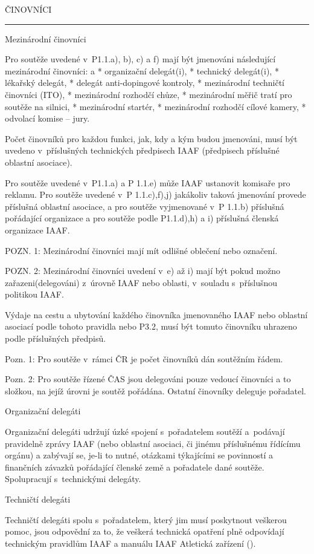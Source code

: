 \sec ČINOVNÍCI

\rule{109}
\secc Mezinárodní činovníci

Pro soutěže uvedené v~P1.1.a), b), c) a f) mají být jmenováni následující mezinárodní činovníci:
\begitems \style a
* organizační delegát(i),
* technický delegát(i),
* lékařský delegát,
* delegát anti-dopingové kontroly,
* mezinárodní techničtí činovníci (ITO),
* mezinárodní rozhodčí chůze,
* mezinárodní měřič tratí pro soutěže na silnici,
* mezinárodní startér,
* mezinárodní rozhodčí cílové kamery,
* odvolací komise -- jury.
\enditems

Počet činovníků pro každou funkci, jak, kdy a kým budou jmenováni, musí být uvedeno v~příslušných technických předpisech IAAF (předpisech příslušné oblastní asociace).

Pro soutěže uvedené v~P1.1.a) a P 1.1.e) může IAAF ustanovit komisaře pro reklamu.
Pro soutěže uvedené v~P 1.1.c),f),j) jakákoliv taková jmenování provede příslušná oblastní asociace, a pro soutěže vyjmenované v~P 1.1.b) příslušná pořádající organizace a pro soutěže podle P1.1.d),h) a i) příslušná členská organizace IAAF.

POZN. 1: Mezinárodní činovníci mají mít odlišné oblečení nebo označení.

POZN. 2: Mezinárodní činovníci uvedení v~e) až i) mají být pokud možno zařazeni(delegováni) z~úrovně IAAF nebo oblasti, v~souladu s~příslušnou politikou IAAF.

Výdaje na cestu a ubytování každého činovníka jmenovaného IAAF nebo oblastní asociací podle tohoto pravidla nebo P3.2, musí být tomuto činovníku uhrazeno podle příslušných předpisů.

Pozn. 1: Pro soutěže v~rámci ČR je počet činovníků dán soutěžním řádem.

Pozn. 2: Pro soutěže řízené ČAS jsou delegováni pouze vedoucí činovníci a to složkou, na jejíž úrovni je soutěž pořádána.
Ostatní činovníky deleguje pořadatel.

\secc Organizační delegáti

Organizační delegáti udržují úzké spojení s~pořadatelem soutěží a~podávají pravidelně zprávy IAAF (nebo oblastní asociaci, či jinému příslušnému řídícímu orgánu) a zabývají se, je-li to nutné, otázkami týkajícími se povinností a finančních závazků pořádající členské země a pořadatele dané soutěže.
Spolupracují s~technickými delegáty.

\secc Techničtí delegáti

Techničtí delegáti spolu s~pořadatelem, který jim musí poskytnout veškerou pomoc, jsou odpovědní za to, že veškerá technická opatření plně odpovídají technickým pravidlům IAAF a manuálu IAAF Atletická zařízení ().


